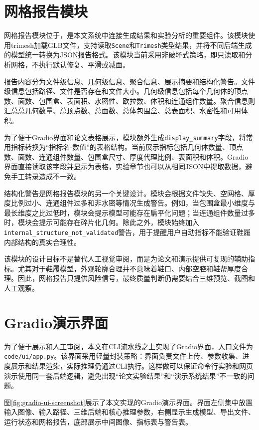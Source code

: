 \section{网格报告模块}

网格报告模块位于，是本文系统中连接生成结果和实验分析的重要组件。该模块使用trimesh加载GLB文件，支持读取\texttt{Scene}和\texttt{Trimesh}类型结果，并将不同后端生成的模型统一转换为JSON报告格式。该模块当前采用非破坏式策略，即只读取和分析网格，不执行默认修复、平滑或减面。

报告内容分为文件级信息、几何级信息、聚合信息、展示摘要和结构化警告。文件级信息包括路径、文件是否存在和文件大小。几何级信息包括每个几何体的顶点数、面数、包围盒、表面积、水密性、欧拉数、体积和连通组件数量。聚合信息则汇总总几何数量、总顶点数、总面数、总体包围盒、总表面积、水密性和可用体积。

为了便于Gradio界面和论文表格展示，模块额外生成\texttt{display\_summary}字段，将常用指标转换为“指标名-数值”的表格结构。当前展示指标包括几何体数量、顶点数、面数、连通组件数量、包围盒尺寸、厚度代理比例、表面积和体积。Gradio界面直接读取该字段并显示为表格，实验章节也可以从相同JSON中提取数据，避免手工转录造成不一致。

结构化警告是网格报告模块的另一个关键设计。模块会根据文件缺失、空网格、厚度比例过小、连通组件过多和非水密等情况生成警告。例如，当包围盒最小维度与最长维度之比过低时，模块会提示模型可能存在扁平化问题；当连通组件数量过多时，模块会提示可能存在碎片化几何。除此之外，模块始终加入\texttt{internal\_structure\_not\_validated}警告，用于提醒用户自动指标不能验证鞋履内部结构的真实合理性。

该模块的设计目标不是替代人工视觉审阅，而是为论文和演示提供可复现的辅助指标。尤其对于鞋履模型，外观轮廓合理并不意味着鞋口、内部空腔和鞋帮厚度合理。因此，网格报告只提供风险信号，最终质量判断仍需要结合三维预览、截图和人工观察。

\section{Gradio演示界面}

为了便于展示和人工审阅，本文在CLI流水线之上实现了Gradio界面，入口文件为\texttt{code/ui/app.py}。该界面采用轻量封装策略：界面负责文件上传、参数收集、进度展示和结果渲染，实际推理仍通过CLI执行。这样做可以保证命令行实验和网页演示使用同一套后端逻辑，避免出现“论文实验结果”和“演示系统结果”不一致的问题。

图\ref{fig:gradio-ui-screenshot}展示了本文实现的Gradio演示界面。界面左侧集中放置输入图像、输入路径、三维后端和核心推理参数，右侧显示生成模型、导出文件、运行状态和网格报告，底部展示中间图像、指标表与警告表。

